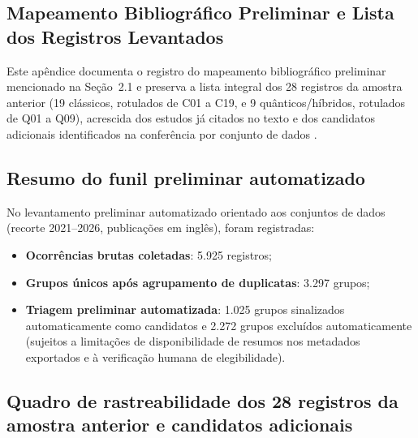 \documentclass[
    12pt,
    openright,
    oneside,
    a4paper,
    english,
    brazil
]{abntex2}
\begin{document}
\postextual



\begin{apendicesenv}
\partapendices

\chapter{Mapeamento Bibliográfico Preliminar e Lista dos Registros Levantados}
\label{ap:matriz_revisao}

Este apêndice documenta o registro do mapeamento bibliográfico preliminar mencionado na Seção~2.1 e preserva a lista integral dos 28 registros da amostra anterior (19 clássicos, rotulados de C01 a C19, e 9 quânticos/híbridos, rotulados de Q01 a Q09), acrescida dos estudos já citados no texto e dos candidatos adicionais identificados na conferência por conjunto de dados \cite{Wazlawick2020}.

\section{Resumo do funil preliminar automatizado}

No levantamento preliminar automatizado orientado aos conjuntos de dados (recorte 2021--2026, publicações em inglês), foram registradas:
\begin{itemize}
    \item \textbf{Ocorrências brutas coletadas}: 5.925 registros;
    \item \textbf{Grupos únicos após agrupamento de duplicatas}: 3.297 grupos;
    \item \textbf{Triagem preliminar automatizada}: 1.025 grupos sinalizados automaticamente como candidatos e 2.272 grupos excluídos automaticamente (sujeitos a limitações de disponibilidade de resumos nos metadados exportados e à verificação humana de elegibilidade).
\end{itemize}

\section{Quadro de rastreabilidade dos 28 registros da amostra anterior e candidatos adicionais}


\end{apendicesenv}
\end{document}

